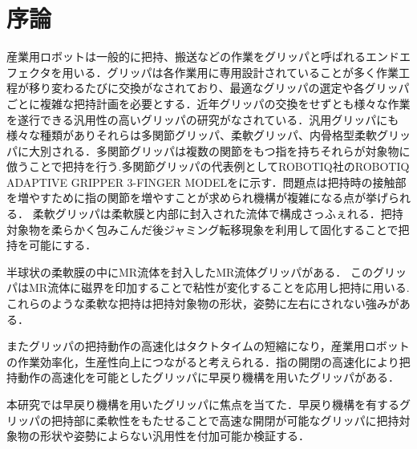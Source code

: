 \section{序論}
\label{sec:序論}
産業用ロボットは一般的に把持、搬送などの作業をグリッパと呼ばれるエンドエフェクタを用いる．グリッパは各作業用に専用設計されていることが多く作業工程が移り変わるたびに交換がなされており、最適なグリッパの選定や各グリッパごとに複雑な把持計画を必要とする．近年グリッパの交換をせずとも様々な作業を遂行できる汎用性の高いグリッパの研究がなされている．汎用グリッパにも様々な種類がありそれらは多関節グリッパ、柔軟グリッパ、内骨格型柔軟グリッパに大別される．多関節グリッパは複数の関節をもつ指を持ちそれらが対象物に倣うことで把持を行う\cite{takansetsu}.多関節グリッパの代表例としてROBOTIQ社のROBOTIQ ADAPTIVE GRIPPER 3-FINGER MODELをに示す．問題点は把持時の接触部を増やすために指の関節を増やすことが求められ機構が複雑になる点が挙げられる．
柔軟グリッパは柔軟膜と内部に封入された流体で構成さっふぇれる．把持対象物を柔らかく包みこんだ後ジャミング転移現象を利用して固化することで把持を可能にする．












半球状の柔軟膜の中にMR流体を封入したMR流体グリッパ\cite{MR}がある．
このグリッパはMR流体に磁界を印加することで粘性が変化することを応用し把持に用いる.これらのような柔軟な把持は把持対象物の形状，姿勢に左右にされない強みがある．\par
またグリッパの把持動作の高速化はタクトタイムの短縮になり，産業用ロボットの作業効率化，生産性向上につながると考えられる．指の開閉の高速化により把持動作の高速化を可能としたグリッパに早戻り機構を用いたグリッパがある\cite{sh_hand}．\par
本研究では早戻り機構を用いたグリッパに焦点を当てた．早戻り機構を有するグリッパの把持部に柔軟性をもたせることで高速な開閉が可能なグリッパに把持対象物の形状や姿勢によらない汎用性を付加可能か検証する．

